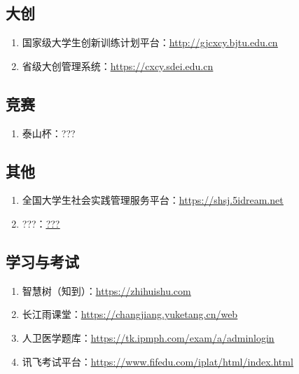 \subsection[大创]{大创}
\begin{enumerate}
    \item 国家级大学生创新训练计划平台：\uline{\href{http://gjcxcy.bjtu.edu.cn}{http://gjcxcy.bjtu.edu.cn}}
    \item 省级大创管理系统：\uline{\href{https://cxcy.sdei.edu.cn}{https://cxcy.sdei.edu.cn}}
\end{enumerate}
\subsection[竞赛]{竞赛}
\begin{enumerate}
    \item 泰山杯：???
\end{enumerate}
\subsection[其他]{其他}
\begin{enumerate}
    \item 全国大学生社会实践管理服务平台：\uline{\href{https://shsj.5idream.net}{https://shsj.5idream.net}}
    \item ???：\uline{\href{???}{???}}
\end{enumerate}

\subsection[学习与考试]{学习与考试}
\begin{enumerate}
    \item 智慧树（知到）：\uline{\href{https://zhihuishu.com}{https://zhihuishu.com}}
    \item 长江雨课堂：\uline{\href{https://changjiang.yuketang.cn/web}{https://changjiang.yuketang.cn/web}}
    \item 人卫医学题库：\uline{\href{https://tk.ipmph.com/exam/a/adminlogin}{https://tk.ipmph.com/exam/a/adminlogin}}
    \item 讯飞考试平台：\uline{\href{https://www.fifedu.com/iplat/html/index.html}{https://www.fifedu.com/iplat/html/index.html}}
\end{enumerate}

